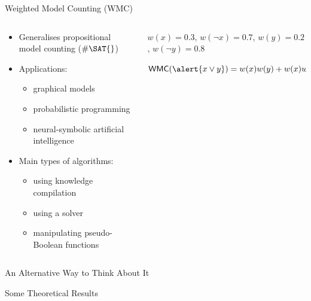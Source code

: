 \documentclass{beamer}
\begin{document}
\begin{frame}[fragile]{Weighted Model Counting (WMC)}
  \begin{columns}
    \begin{column}{0.5\textwidth}
      \begin{itemize}
      \item Generalises propositional model counting ($\#\SAT{}$)
      \item Applications:
        \begin{itemize}
        \item graphical models
        \item probabilistic programming
        \item neural-symbolic artificial intelligence
        \end{itemize}
      \item Main types of algorithms:
        \begin{itemize}
        \item using knowledge compilation
        \item using a \SAT{} solver
        \item manipulating pseudo-Boolean functions
        \end{itemize}
      \end{itemize}
    \end{column}
    \begin{column}{0.5\textwidth}
      \begin{example}
      $w(x) = 0.3$, $w(\neg x) = 0.7$, $w(y) = 0.2$, $w(\neg y) = 0.8$
      \vspace{1cm}

      $\mathsf{WMC}(\alert{x \lor y}) = w(x)w(y) + w(x)w(\neg y) + w(\neg x)w(y)
      = 0.44$
      \end{example}
    \end{column}
  \end{columns}
\end{frame}

\begin{frame}{An Alternative Way to Think About It}
\end{frame}

\begin{frame}{Some Theoretical Results}
\end{frame}

\end{document}
